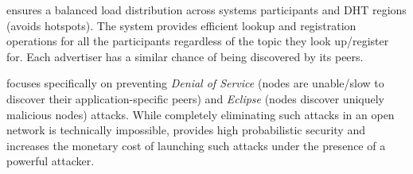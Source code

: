  \sysname ensures a balanced load distribution across systems participants and DHT regions (\ie avoids hotspots). The system provides efficient lookup and registration operations for all the participants regardless of the topic they look up/register for. Each advertiser has a similar chance of being discovered by its peers. 

 \sysname focuses specifically on preventing \emph{Denial of Service} (nodes are unable/slow to discover their application-specific peers) and \emph{Eclipse} (nodes discover uniquely malicious nodes) attacks. While completely eliminating such attacks in an open network is technically impossible, \sysname provides high probabilistic security and increases the monetary cost of launching such attacks under the presence of a powerful attacker.